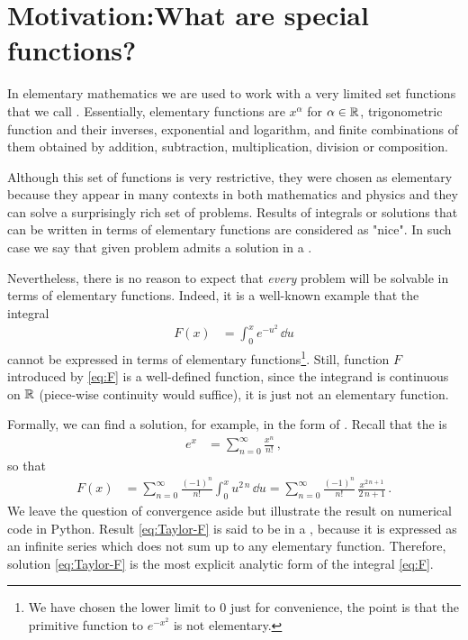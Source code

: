 \chapter{Motivation:What are special functions?}

In elementary mathematics we are used to work with a very limited set functions that we call . Essentially, elementary functions are $x^\alpha$ for $\alpha\in\mathbb{R}$, trigonometric function and their inverses, exponential and logarithm, and finite combinations of them obtained by addition, subtraction, multiplication, division
or composition. 

Although this set of functions is very restrictive, they were chosen as elementary because they appear in many contexts in both mathematics and physics and they can solve a surprisingly rich set of problems. Results
of integrals or solutions that can be written in terms of elementary functions are considered as "nice". In such case we say that given problem admits a solution in a .

Nevertheless, there is no reason to expect that {\itshape every} problem will be solvable in terms of elementary functions. Indeed, it is a well-known example that the integral
\begin{align}\label{eq:F}
    F(x) &= \int_{0}^x e^{-u^2}\,\dd u
\end{align}
cannot be expressed in terms of elementary functions\footnote{We have chosen the lower limit to $0$ just for convenience, the point is that the primitive function to $e^{-x^2}$ is not elementary.}. Still, function $F$ introduced by \eqref{eq:F} is a well-defined function, since the integrand is continuous on $\mathbb{R}$ (piece-wise continuity would suffice), it is just not an elementary function. 

Formally, we can find a solution, for example, in the form of . Recall that the   is
\begin{align}\label{eq:Taylor-exp}
    e^x &= \sum_{n=0}^\infty \frac{x^n}{n!}\, ,
\end{align}
so that 
\begin{align}\label{eq:Taylor-F}
    F(x) &= \sum_{n=0}^\infty\frac{(-1)^n}{n!}\int_0^x u^{2\,n}\,\dd u =
        \sum_{n=0}^\infty\frac{(-1)^n}{n!}\,\frac{x^{2\,n+1}}{2\,n+1}\, .
\end{align}
We leave the question of convergence aside but illustrate the result on numerical code in Python. Result \eqref{eq:Taylor-F} is said to be in a , because it is expressed as an infinite series which does not sum up to any elementary function. Therefore, solution \eqref{eq:Taylor-F} is the most explicit analytic form of the integral \eqref{eq:F}. 

